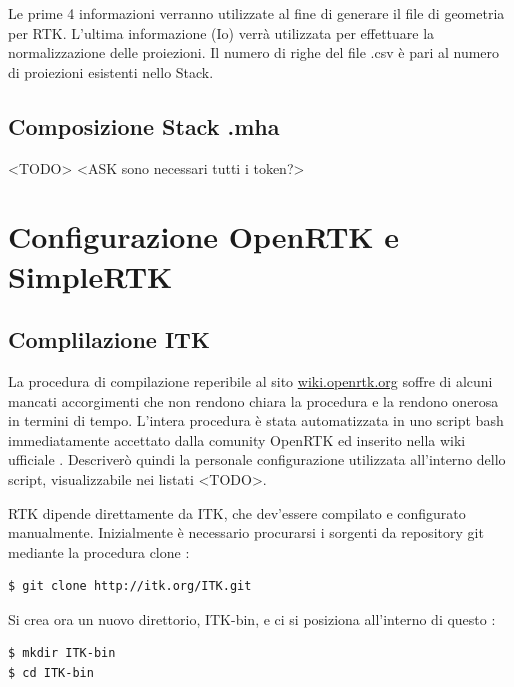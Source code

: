 \documentclass[a4paper,12pt, doubleside]{report}
\begin{document}
                    Le prime 4 informazioni verranno utilizzate al fine di generare il file di geometria per RTK. L'ultima informazione (Io) verrà utilizzata per effettuare la normalizzazione delle proiezioni. Il numero di righe del file .csv è pari al numero di proiezioni esistenti nello Stack.
                    
            \subsection{Composizione Stack .mha} 
                <TODO>
                <ASK sono necessari tutti i token?>
          
            
        \section{Configurazione OpenRTK e SimpleRTK}
            \subsection{Complilazione ITK}
                \par
                    La procedura di compilazione reperibile al sito \url{wiki.openrtk.org} soffre di alcuni mancati accorgimenti che non rendono chiara la procedura e la rendono onerosa in termini di tempo. L'intera procedura è stata automatizzata in uno script bash immediatamente accettato dalla comunity OpenRTK ed inserito nella wiki ufficiale
                    \cite{wiki-rtk}. Descriverò quindi la personale configurazione utilizzata all'interno dello script, visualizzabile nei listati <TODO>.
                \par    
                    RTK dipende direttamente da ITK, che dev'essere compilato e configurato manualmente. 
                    Inizialmente è necessario procurarsi i sorgenti da repository git mediante la procedura clone :
                    \begin{lstlisting}[language=bash, frame=bt]
$ git clone http://itk.org/ITK.git
                    \end{lstlisting}
                    
                    \bigskip
                    Si crea ora un nuovo direttorio, ITK-bin, e ci si posiziona all'interno di questo :
                    \begin{lstlisting}[language=bash, frame=bt]
$ mkdir ITK-bin
$ cd ITK-bin
                    \end{lstlisting}
                    
\end{document}
